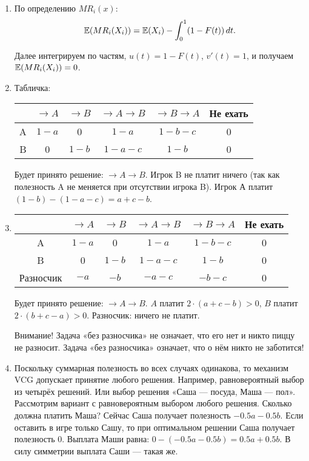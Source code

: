 \begin{enumerate}
\item По определению $ MR_{i}(x) $:
\begin{equation}
\operatorname{\mathbb{E}}(MR_{i}(X_{i}))=\operatorname{\mathbb{E}}(X_{i})-\int_{0}^{1}(1-F(t)) \, dt.
\end{equation}

Далее интегрируем по частям, $ u(t)=1-F(t) $, $ v'(t)=1 $, и получаем $ \operatorname{\mathbb{E}}(MR_{i}(X_{i}))=0 $.

\item Табличка:

\begin{tabular}{c|ccccc}
& $ \to A $ & $ \to B $ & $ \to A\to B $ & $ \to B \to A $ & Не ехать \\
\hline
A & $ 1-a $ & 0 & $ 1-a $ & $ 1-b-c $ & 0 \\
B & 0 & $ 1-b $ & $ 1-a-c $ & $ 1-b $ & 0 \\
\end{tabular}

Будет принято решение: $ \to A\to B $. Игрок B не платит ничего (так как полезность A не меняется при отсутствии игрока B). Игрок А платит $ (1-b)-(1-a-c)=a+c-b $.

\item \begin{tabular}{c|ccccc}
& $ \to A $ & $ \to B $ & $ \to A\to B $ & $ \to B \to A $ & Не ехать \\
\hline
A & $ 1-a $ & 0 & $ 1-a $ & $ 1-b-c $ & 0 \\
B & 0 & $ 1-b $ & $ 1-a-c $ & $ 1-b $ & 0 \\
Разносчик & $ -a $ & $ -b $ & $ -a-c $ & $ -b-c $ & 0 \\
\end{tabular}

Будет принято решение: $ \to A\to B $. $ A $ платит $ 2\cdot (a+c-b)>0 $, $ B $ платит $ 2\cdot (b+c-a)>0 $. Разносчик: ничего не платит.

Внимание! Задача «без разносчика» не означает, что его нет и никто пиццу не разносит. Задача «без разносчика» означает, что о нём никто не заботится!

\item Поскольку суммарная полезность во всех случаях одинакова, то механизм VCG допускает принятие любого решения. Например, равновероятный выбор из четырёх решений. Или выбор решения «Саша — посуда, Маша — пол». Рассмотрим вариант с равновероятным выбором любого решения. Сколько должна платить Маша? Сейчас Саша получает полезность $-0.5a-0.5b $. Если оставить в игре только Сашу, то при оптимальном решении Саша получает полезность $ 0 $. Выплата Маши равна: $0-(-0.5a-0.5b)=0.5a+0.5b$. В силу симметрии выплата Саши — такая же.


\end{enumerate}
